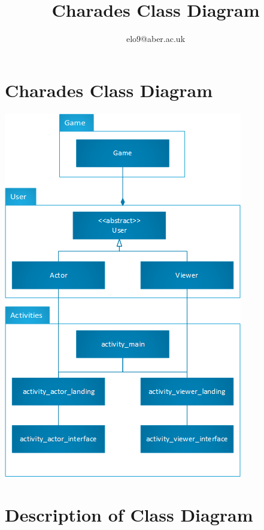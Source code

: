 \documentclass{article}
\title{Charades Class Diagram}
\author{elo9@aber.ac.uk}
\begin{document}
\maketitle
\tableofcontents

\newpage

\section{Charades Class Diagram}
\includegraphics[width=\textwidth]{CharadesClassImage}

\newpage


\section{Description of Class Diagram}
\end{document}
